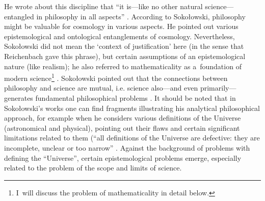 \documentclass[%
  manuscript=article,
  year=2024,
  volume=77,
  doi=10.59203/zfn.77.689,
]{zfn}
\begin{document}
He wrote about this discipline that ``it is---like no other natural science---entangled in philosophy in all aspects''
\parencite[][p.226]{Sokoowski2017Kopoty}. %
 According to Sokołowski, philosophy might be valuable for cosmology in various aspects. He pointed out various epistemological and ontological entanglements of cosmology. Nevertheless, Sokołowski did not mean the ‘context of justification' here (in the sense that Reichenbach gave this phrase), but certain assumptions of an epistemological nature (like realism); he also referred to mathematicality as a~foundation of modern science\footnote{I~will discuss the problem of mathematicality in detail below. } 
\parencite[][p.181]{Sokoowski2014Czy}. %
 Sokołowski pointed out that the connections between philosophy and science are mutual, i.e. science also---and even primarily---generates fundamental philosophical problems 
\parencite[][p.56]{Sokoowski2015Granice}. %
 It should be noted that in Sokołowski's works one can find fragments illustrating his analytical philosophical approach, for example when he considers various definitions of the Universe (astronomical and physical), pointing out their flaws and certain significant limitations related to them (``all definitions of the Universe are defective: they are incomplete, unclear or too narrow''
\parencite[][p.235]{Sokoowski2017Kopoty}. %
 Against the background of problems with defining the ``Universe'', certain epistemological problems emerge, especially related to the problem of the scope and limits of science.
\end{document}
